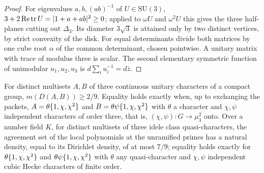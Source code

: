 \begin{proof}
For eigenvalues $a,b,(ab)^{-1}$ of $U\in\mathrm{SU}(3)$, $3+2\operatorname{Re}\operatorname{tr} U=\lvert1+a+ab\rvert^2\ge0$; applied to $\omega U$ and
$\omega^2U$ this gives the three half-planes cutting out $\Delta_3$. Its diameter $3\sqrt3$ is attained only by two
distinct vertices, by strict convexity of the disk. For equal determinants divide both matrices by one cube root
$\alpha$ of the common determinant, chosen pointwise. A unitary matrix with trace of modulus three is scalar. The
second elementary symmetric function of unimodular $u_1,u_2,u_3$ is $d\sum_iu_i^{-1}=d\bar z$.
\end{proof}

\begin{theorem}\label{eul:thm:abelian}
For distinct multisets $A,B$ of three continuous unitary characters of a compact group, $m(D(A,B))\ge2/9$. Equality
holds exactly when, up to exchanging the packets, $A=\theta\{1,\chi,\chi^2\}$ and $B=\theta\psi\{1,\chi,\chi^2\}$
with $\theta$ a character and $\chi,\psi$ independent characters of order three, that is, $(\chi,\psi)\colon G\to\mu_3^2$
onto. Over a number field $K$, for distinct multisets of three idele class quasi-characters, the agreement set of
the local polynomials at the unramified primes has a natural density, equal to its Dirichlet density, of at most
$7/9$; equality holds exactly for $\theta\{1,\chi,\chi^2\}$ and $\theta\psi\{1,\chi,\chi^2\}$ with $\theta$ any
quasi-character and $\chi,\psi$ independent cubic Hecke characters of finite order.
\end{theorem}

